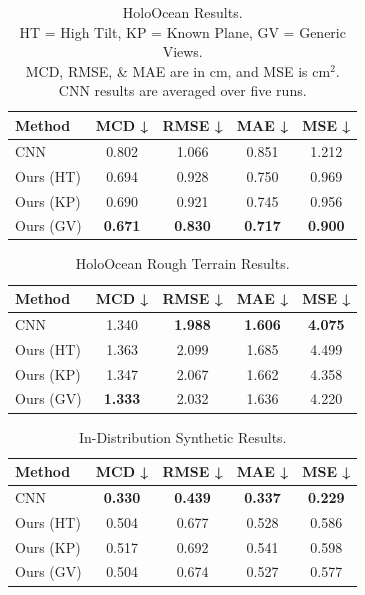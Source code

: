 \begin{table}[t]
  \centering
  \caption{
    \centering
        HoloOcean Results.\\
      HT = High Tilt, KP = Known Plane, GV = Generic Views.\\
      MCD, RMSE, \& MAE are in cm, and MSE is cm$^2$.\\
      CNN results are averaged over five runs.}
  \label{tab:holoocean}
  \begin{tabular}{lcccc}
    \toprule
    Method & MCD ↓ & RMSE ↓ & MAE ↓ & MSE ↓ \\
    \midrule
    CNN & 0.802 & 1.066 & 0.851 & 1.212 \\
    Ours (HT) & 0.694 & 0.928 & 0.750 & 0.969 \\
    Ours (KP) & 0.690 & 0.921 & 0.745 & 0.956 \\
    Ours (GV) & \textbf{0.671} & \textbf{0.830} & \textbf{0.717} & \textbf{0.900} \\
    \bottomrule
  \end{tabular}
\end{table}
\begin{table}[t]
  \centering
  \caption{HoloOcean Rough Terrain Results.}
  \label{tab:holoocean_rough}
  \begin{tabular}{lcccc}
    \toprule
    Method & MCD ↓ & RMSE ↓ & MAE ↓ & MSE ↓ \\
    \midrule
    CNN & 1.340 & \textbf{1.988} & \textbf{1.606} & \textbf{4.075} \\
    Ours (HT) & 1.363  & 2.099 & 1.685 & 4.499 \\
    Ours (KP) & 1.347 & 2.067 & 1.662 & 4.358 \\
    Ours (GV) & \textbf{1.333} & 2.032 & 1.636 & 4.220 \\
    \bottomrule
  \end{tabular}
\end{table}
\begin{table}[t]
  \centering
  \caption{
    \centering
      In-Distribution Synthetic Results.}
  \label{tab:in_dist}
  \begin{tabular}{lcccc}
    \toprule
    Method & MCD ↓ & RMSE ↓ & MAE ↓ & MSE ↓ \\
    \midrule
    CNN & \textbf{0.330} & \textbf{0.439} & \textbf{0.337} & \textbf{0.229} \\
    Ours (HT) & 0.504 & 0.677 & 0.528 & 0.586 \\
    Ours (KP) & 0.517 & 0.692 & 0.541  & 0.598 \\
    Ours (GV) & 0.504 & 0.674 & 0.527 & 0.577 \\
    \bottomrule
  \end{tabular}
  \vspace{-3mm}
\end{table}

